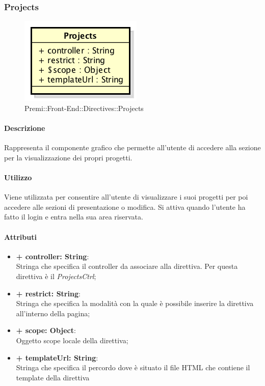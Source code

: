 \subsubsection{Projects}
	\begin{figure}[h]
		\centering
		\includegraphics[width=0.4\linewidth]{img/premi_front_end_directives_projects}
		\caption[Premi::Front-End::Directives::Projects]{Premi::Front-End::Directives::Projects}
	\end{figure}
	
	\paragraph{Descrizione}
	Rappresenta il componente grafico che permette all'utente di accedere alla sezione per la visualizzazione dei propri progetti.
	
	\paragraph{Utilizzo}
	Viene utilizzata per consentire all'utente di visualizzare i suoi progetti per poi accedere alle sezioni di presentazione o modifica. Si attiva quando l'utente ha fatto il login e entra nella sua area riservata.
	
	\paragraph{Attributi}
	\begin{itemize}
		\item \textbf{+ controller: String}:\\
			Stringa che specifica il controller da associare alla direttiva. Per questa direttiva è il \textit{ProjectsCtrl};
		\item \textbf{+ restrict: String}:\\
			Stringa che specifica la modalità con la quale è possibile inserire la direttiva all'interno della pagina;
		\item \textbf{+ scope: Object}:\\
			Oggetto scope locale della direttiva;
		\item \textbf{+ templateUrl: String}:\\
			Stringa che specifica il percordo dove è situato il file \gls{HTML} che contiene il \gls{template} della direttiva
	\end{itemize}
\newpage



